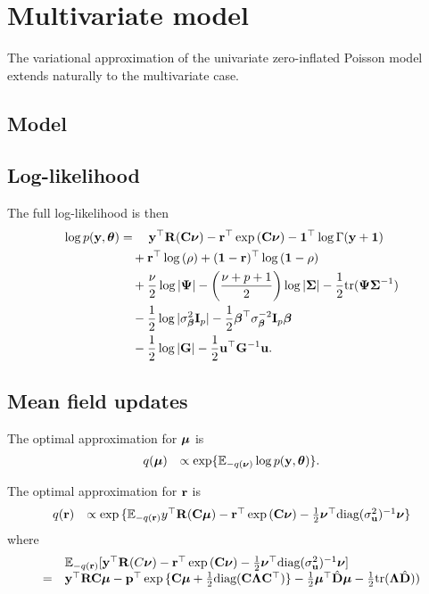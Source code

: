 \documentclass{amsart}[12pt]
\begin{document}
\section{Multivariate model}

The variational approximation of the univariate zero-inflated Poisson model extends naturally to the
multivariate case.

\subsection{Model}

\subsection{Log-likelihood}
The full log-likelihood is then
\begin{align*}
	\log p({\bf y}, {\boldsymbol \theta}) & = \quad {\bf y}^\top {\bf R}({\bf C} {\boldsymbol \nu}) - {\bf r}^\top \exp{({\bf C}{\boldsymbol\nu})} - {\bf 1}^\top \log \Gamma({\bf y} + {\bf 1})                                 \\
	                     & \quad + {\bf r}^\top \log{(\rho)} + ({\bf 1} - {\bf r})^\top \log{({\bf1}- \rho)}                                                          \\
	                     & \quad + \frac{\nu}{2} \log |{\boldsymbol \Psi}| - \left( \frac{\nu + p + 1}{2} \right) \log{|{\boldsymbol\Sigma}|} - \frac{1}{2} \text{tr} ({\boldsymbol \Psi} {\boldsymbol \Sigma}^{-1}) \\
	                     & \quad - \frac{1}{2} \log{|\sigma^2_{\boldsymbol\beta}{\bf I}_p|} - \frac{1}{2} {\boldsymbol \beta}^\top \sigma_{\boldsymbol \beta}^{-2} {\bf I}_p {\boldsymbol \beta}                      \\
	                     & \quad - \frac{1}{2} \log |{\bf G}| - \frac{1}{2} {\bf u}^\top {\bf G}^{-1} {\bf u}.                                                                
\end{align*}

\subsection{Mean field updates}
The optimal approximation for ${\boldsymbol \mu}$ is
\[
	\begin{array}{rl}
		q({\boldsymbol \mu}) & \propto \exp \{ \mathbb{E}_{-q({\boldsymbol \nu})} \log p({\bf y}, {\boldsymbol \theta}) \}.
	\end{array}
\]

\noindent The optimal approximation for ${\bf r}$ is
\[
	\begin{array}{rl}
		q({\bf r}) & \propto \exp{\{\mathbb{E}_{-q({\bf r})}y^\top{\bf R}({\bf C}{\boldsymbol\mu}) - {\bf r}^\top\exp{({\bf C}{\boldsymbol\nu})}- \frac{1}{2} {\boldsymbol\nu}^\top \text{diag}(\sigma_{{\bf u}}^2)^{-1} {\boldsymbol\nu}\}} 
	\end{array}
\]
where
\[
	\begin{array}{rl}
		  & \mathbb{E}_{-q({\bf r})} [{\bf y}^\top{\bf R}(C{\boldsymbol \nu}) - {\bf r}^\top\exp{({\bf C}{\boldsymbol\nu})}- \frac{1}{2} {\boldsymbol \nu}^\top \text{diag}(\sigma_{{\bf u}}^2)^{-1} {\boldsymbol \nu}]                                                 \\
		= & {\bf y}^\top{\bf R}{\bf C} {\boldsymbol\mu} - {\bf p}^\top \exp{\{{\bf C}{\boldsymbol\mu}+  \frac{1}{2} \text{diag}({\bf C}{\boldsymbol\Lambda}{\bf C}^\top)\}} -  \frac{1}{2} {\boldsymbol \mu}^\top \hat{{\bf D}} {\boldsymbol \mu} - \tfrac{1}{2} \text{tr}({\boldsymbol \Lambda} \hat{{\bf D}} )) 
	\end{array}
\]
\end{document}
